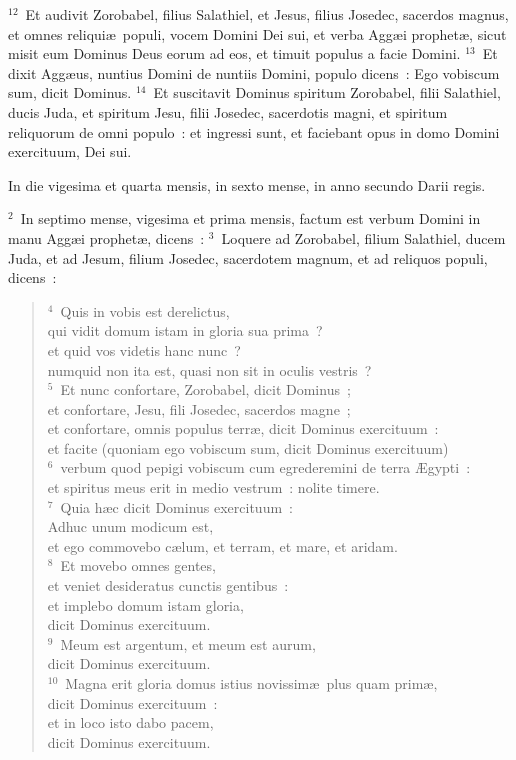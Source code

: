 ${}^{12}$~Et audivit Zorobabel, filius Salathiel, et Jesus, filius Josedec, sacerdos magnus, et omnes reliqui\ae\ populi, vocem Domini Dei sui, et verba Agg\ae i prophet\ae , sicut misit eum Dominus Deus eorum ad eos, et timuit populus a facie Domini.
${}^{13}$~Et dixit Agg\ae us, nuntius Domini de nuntiis Domini, populo dicens~: Ego vobiscum sum, dicit Dominus.
${}^{14}$~Et suscitavit Dominus spiritum Zorobabel, filii Salathiel, ducis Juda, et spiritum Jesu, filii Josedec, sacerdotis magni, et spiritum reliquorum de omni populo~: et ingressi sunt, et faciebant opus in domo Domini exercituum, Dei sui.

\lettrine[lines=3,image=true,loversize=0.05,lraise=-0.03]{I}{}n die vigesima et quarta mensis, in sexto mense, in anno secundo Darii regis.


${}^{2}$~In septimo mense, vigesima et prima mensis, factum est verbum Domini in manu Agg\ae i prophet\ae , dicens~:
${}^{3}$~Loquere ad Zorobabel, filium Salathiel, ducem Juda, et ad Jesum, filium Josedec, sacerdotem magnum, et ad reliquos populi, dicens~:
\begin{flushleft}\begin{verse}${}^{4}$~Quis in vobis est derelictus,\\ qui vidit domum istam in gloria sua prima~?\\ et quid vos videtis hanc nunc~?\\ numquid non ita est, quasi non sit in oculis vestris~?\\
${}^{5}$~Et nunc confortare, Zorobabel, dicit Dominus~;\\ et confortare, Jesu, fili Josedec, sacerdos magne~;\\ et confortare, omnis populus terr\ae , dicit Dominus exercituum~:\\ et facite (quoniam ego vobiscum sum, dicit Dominus exercituum)\\
${}^{6}$~verbum quod pepigi vobiscum cum egrederemini de terra \AE gypti~:\\ et spiritus meus erit in medio vestrum~: nolite timere.\\
${}^{7}$~Quia h\ae c dicit Dominus exercituum~:\\ Adhuc unum modicum est,\\ et ego commovebo c\ae lum, et terram, et mare, et aridam.\\
${}^{8}$~Et movebo omnes gentes,\\ et veniet desideratus cunctis gentibus~:\\ et implebo domum istam gloria,\\ dicit Dominus exercituum.\\
${}^{9}$~Meum est argentum, et meum est aurum,\\ dicit Dominus exercituum.\\
${}^{10}$~Magna erit gloria domus istius novissim\ae\ plus quam prim\ae ,\\ dicit Dominus exercituum~:\\ et in loco isto dabo pacem,\\ dicit Dominus exercituum.\end{verse}\end{flushleft}


